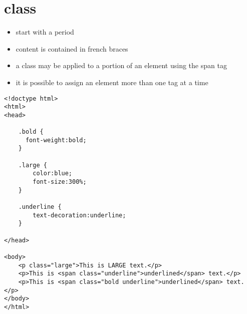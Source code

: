 \documentclass{article}
\begin{document}
\section{class}
\begin{itemize}
  \item start with a period
  \item content is contained in french braces
  \item a class may be applied to a portion of an element using the span tag
  \item it is possible to assign an element more than one tag at a time
\end{itemize}
\begin{lstlisting}
<!doctype html>
<html>
<head>

    .bold {
      font-weight:bold;
    }

    .large {
        color:blue;
        font-size:300%;
    }

    .underline {
        text-decoration:underline;
    }

</head>

<body>
    <p class="large">This is LARGE text.</p>
    <p>This is <span class="underline">underlined</span> text.</p>
    <p>This is <span class="bold underline">underlined</span> text.</p>
</body>
</html>
\end{lstlisting}

\end{document}
